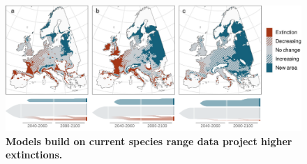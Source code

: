 \documentclass[11pt,letter]{article}
\begin{document}

\begin{figure}
	\centering
	\includegraphics[width=1\linewidth]{../newfigures/files/sankey/fagus_sankey.pdf}
	\caption{\textbf{Models build on current species range data project higher extinctions.}}
	\label{fig:diffproj}
\end{figure}
\end{document}
